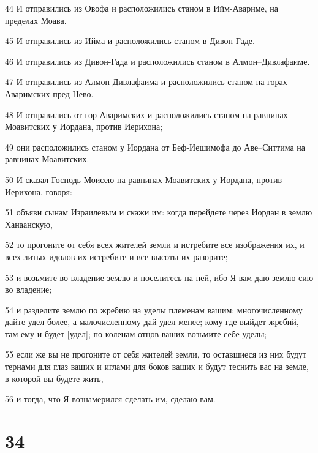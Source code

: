 \par 44 И отправились из Овофа и расположились станом в Ийм-Авариме, на пределах Моава.
\par 45 И отправились из Ийма и расположились станом в Дивон-Гаде.
\par 46 И отправились из Дивон-Гада и расположились станом в Алмон--Дивлафаиме.
\par 47 И отправились из Алмон-Дивлафаима и расположились станом на горах Аваримских пред Нево.
\par 48 И отправились от гор Аваримских и расположились станом на равнинах Моавитских у Иордана, против Иерихона;
\par 49 они расположились станом у Иордана от Беф-Иешимофа до Аве--Ситтима на равнинах Моавитских.
\par 50 И сказал Господь Моисею на равнинах Моавитских у Иордана, против Иерихона, говоря:
\par 51 объяви сынам Израилевым и скажи им: когда перейдете через Иордан в землю Ханаанскую,
\par 52 то прогоните от себя всех жителей земли и истребите все изображения их, и всех литых идолов их истребите и все высоты их разорите;
\par 53 и возьмите во владение землю и поселитесь на ней, ибо Я вам даю землю сию во владение;
\par 54 и разделите землю по жребию на уделы племенам вашим: многочисленному дайте удел более, а малочисленному дай удел менее; кому где выйдет жребий, там ему и будет [удел]; по коленам отцов ваших возьмите себе уделы;
\par 55 если же вы не прогоните от себя жителей земли, то оставшиеся из них будут тернами для глаз ваших и иглами для боков ваших и будут теснить вас на земле, в которой вы будете жить,
\par 56 и тогда, что Я вознамерился сделать им, сделаю вам.

\chapter{34}

